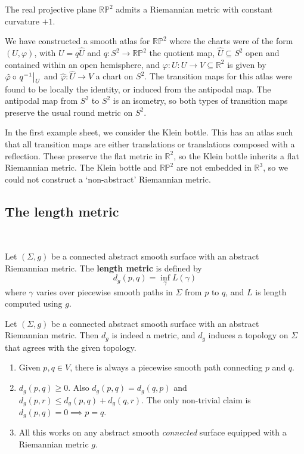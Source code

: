 \documentclass[a4paper]{article}
\begin{document}
\begin{example}
	The real projective plane \( \mathbb R \mathbb P^2 \) admits a Riemannian metric with constant curvature \( +1 \).

	We have constructed a smooth atlas for \( \mathbb R \mathbb P^2 \) where the charts were of the form \( (U, \varphi) \), with \( U = q \hat U \) and \( q \colon S^2 \to \mathbb R \mathbb P^2 \) the quotient map, \( \hat U \subseteq S^2 \) open and contained within an open hemisphere, and \( \varphi \colon U \colon U \to V \subseteq \mathbb R^2 \) is given by \( \hat \varphi \circ \eval{q^{-1}}_U \) and \( \hat \varphi \colon \hat U \to V \) a chart on \( S^2 \).
	The transition maps for this atlas were found to be locally the identity, or induced from the antipodal map.
	The antipodal map from \( S^2 \) to \( S^2 \) is an isometry, so both types of transition maps preserve the usual round metric on \( S^2 \).
\end{example}

\begin{example}
	In the first example sheet, we consider the Klein bottle.
	This has an atlas such that all transition maps are either translations or translations composed with a reflection.
	These preserve the flat metric in \( \mathbb R^2 \), so the Klein bottle inherits a flat Riemannian metric.
	The Klein bottle and \( \mathbb R \mathbb P^2 \) are not embedded in \( \mathbb R^3 \), so we could not construct a `non-abstract' Riemannian metric.
\end{example}

\subsection{The length metric}
\ \vspace*{-1.5em}
\begin{definition}
	Let \( (\Sigma, g) \) be a connected abstract smooth surface with an abstract Riemannian metric.
	The \textbf{length metric} is defined by
	\[
		d_g(p,q) = \inf_\gamma L(\gamma)
	\]
	where \( \gamma \) varies over piecewise smooth paths in \( \Sigma \) from \( p \) to \( q \), and \( L \) is length computed using \( g \).
\end{definition}
\begin{proposition}
	Let \( (\Sigma, g) \) be a connected abstract smooth surface with an abstract Riemannian metric.
	Then \( d_g \) is indeed a metric, and \( d_g \) induces a topology on \( \Sigma \) that agrees with the given topology.
\end{proposition}
\begin{remark}
	\begin{enumerate}
		\item Given $p,q\in V$, there is always a piecewise smooth path connecting $p$ and $q$. 
		\item $ d_g(p,q)\ge 0$. Also $ d_g(p,q) = d_g(q,p) $ and $ d_g(p,r)\le d_g(p,q) + d_g(q,r) $. The only non-trivial claim is $ d_g(p,q) = 0 \implies p=q.  $
		\item All this works on any abstract smooth \textit{connected} surface equipped with a Riemannian metric $g$. 
	\end{enumerate}
\end{remark}
\end{document}
